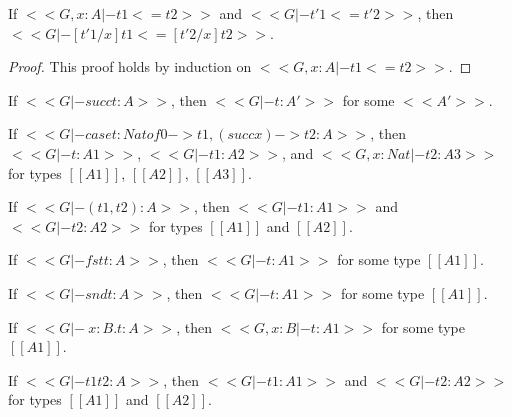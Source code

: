 \begin{lemma}
  \label{lemma:substitution_for_term_precision}
  If $<<G, x : A |- t1 <= t2>>$ and $<<G |- t'1 <= t'2>>$, then $<<G |- [t'1/x]t1 <= [t'2/x]t2>>$.  
\end{lemma}
\begin{proof}
  This proof holds by induction on $<<G, x : A |- t1 <= t2>>$.
\end{proof}

\begin{lemma}
  \label{lemma:typeability_inversion}
  \begin{enumR}\small
  \item[] 
  \item If $<<G |- succ t : A>>$, then $<<G |- t : A'>>$ for some $<<A'>>$.
  \item If $<<G |- case t : Nat of 0 -> t1, (succ x) -> t2 : A>>$, then $<<G |- t : A1>>$, $<<G |- t1 : A2>>$,
    and $<<G,x : Nat |- t2 : A3>>$ for types $[[A1]]$, $[[A2]]$, $[[A3]]$.
  \item If $<<G |- (t1, t2) : A>>$, then $<<G |- t1 : A1>>$ and  $<<G |- t2 : A2>>$ for types $[[A1]]$ and $[[A2]]$.
  \item If $<<G |- fst t : A>>$, then $<<G |- t : A1>>$ for some type $[[A1]]$.
  \item If $<<G |- snd t : A>>$, then $<<G |- t : A1>>$ for some type $[[A1]]$.    
  \item If $<<G |- \ x : B . t : A>>$, then $<<G, x : B |- t : A1>>$ for some type $[[A1]]$.
  \item If $<<G |- t1 t2 : A>>$, then $<<G |- t1 : A1>>$ and  $<<G |- t2 : A2>>$ for types $[[A1]]$ and $[[A2]]$.  
  \end{enumR}
\end{lemma}

